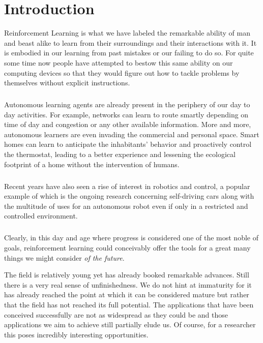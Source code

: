 \chapter{Introduction}

\label{introduction}
Reinforcement Learning is what we have labeled the remarkable ability of man and beast alike
to learn from their surroundings and their interactions with it.
It is embodied in our learning from past mistakes or our failing to do so.
For quite some time now people have attempted to bestow this same ability on
our computing devices so that they would figure out how to tackle problems by themselves
without explicit instructions.

\paragraph{}
Autonomous learning agents are already present
in the periphery of our day to day activities.
For example,
networks can learn to route smartly
depending on time of day
and congestion
or any other available information.
More and more,
autonomous learners are even invading
the commercial and personal space.
Smart homes can learn to anticipate the inhabitants'
behavior and proactively control the thermostat,
leading to a better experience
and lessening the ecological footprint of a home
without the intervention of humans.

\paragraph{}
Recent years have also seen a rise of interest
in robotics and control,
a popular example of which is the ongoing research
concerning self-driving cars
\parencite{selfdriving}
along with the multitude of uses for an autonomous robot
even if only in a restricted and controlled environment.

\paragraph{}
Clearly,
in this day and age
where progress is considered
one of the most noble of goals,
reinforcement learning could conceivably
offer the tools
for a great many things
we might consider \textit{of the future}.

The field is relatively young
yet has already booked remarkable advances.
Still there is a very real sense of unfinishedness.
We do not hint at immaturity
for it has already reached the point
at which it can be considered mature
but rather that the field has not reached its full potential.
The applications that have been conceived successfully
are not as widespread as they could be
and those applications we aim to achieve
still partially elude us.
Of course, for a researcher
this poses incredibly interesting opportunities.

